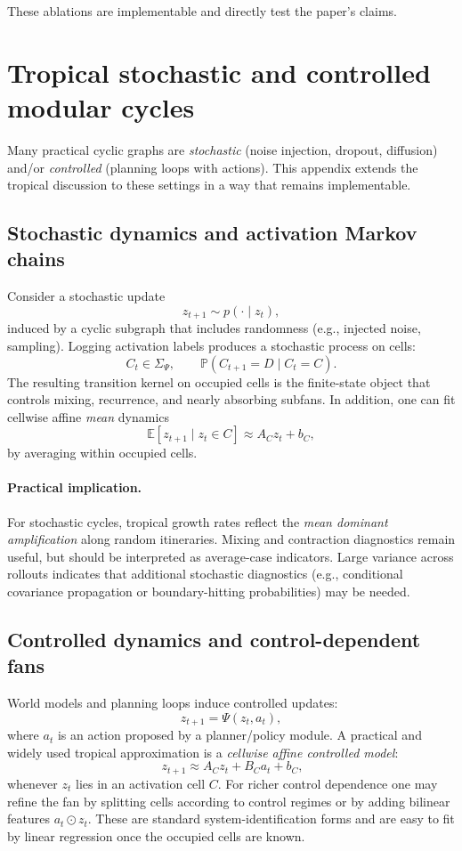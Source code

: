 \documentclass[11pt]{article}
\theoremstyle{definition}
\theoremstyle{plain}
\theoremstyle{remark}
\newcommand{\E}{\mathbb{E}}
\begin{document}
These ablations are implementable and directly test the paper's claims.



\section{Tropical stochastic and controlled modular cycles}
\label{app:tropical-estimation-controlled}

Many practical cyclic graphs are \emph{stochastic} (noise injection, dropout, diffusion) and/or \emph{controlled} (planning loops with actions).
This appendix extends the tropical discussion to these settings in a way that remains implementable.

\subsection{Stochastic dynamics and activation Markov chains}
Consider a stochastic update
\[
z_{t+1} \sim p(\cdot \mid z_t),
\]
induced by a cyclic subgraph that includes randomness (e.g., injected noise, sampling).
Logging activation labels produces a stochastic process on cells:
\[
C_t \in \Sigma_\Psi,\qquad
\mathbb{P}(C_{t+1}=D \mid C_t=C).
\]
The resulting transition kernel on occupied cells is the finite-state object that controls mixing, recurrence, and nearly absorbing subfans.
In addition, one can fit cellwise affine \emph{mean} dynamics
\[
\E[z_{t+1}\mid z_t\in C] \approx A_C z_t+b_C,
\]
by averaging within occupied cells.

\paragraph{Practical implication.}
For stochastic cycles, tropical growth rates reflect the \emph{mean dominant amplification} along random itineraries.
Mixing and contraction diagnostics remain useful, but should be interpreted as average-case indicators.
Large variance across rollouts indicates that additional stochastic diagnostics (e.g., conditional covariance propagation or boundary-hitting probabilities) may be needed.

\subsection{Controlled dynamics and control-dependent fans}
World models and planning loops induce controlled updates:
\[
z_{t+1} = \Psi(z_t, a_t),
\]
where $a_t$ is an action proposed by a planner/policy module.
A practical and widely used tropical approximation is a \emph{cellwise affine controlled model}:
\[
\ z_{t+1} \approx A_C z_t + B_C a_t + b_C,
\]
whenever $z_t$ lies in an activation cell $C$.
For richer control dependence one may refine the fan by splitting cells according to control regimes or by adding bilinear features $a_t\odot z_t$.
These are standard system-identification forms and are easy to fit by linear regression once the occupied cells are known.
\end{document}
